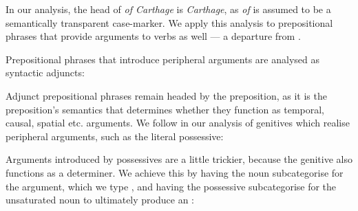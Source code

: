 \documentclass[11pt]{article}
\begin{document}
In our analysis, the head of \emph{of Carthage} is \emph{Carthage}, as \emph{of} is
assumed to be a semantically transparent case-marker. We apply this analysis
to prepositional phrases that provide arguments to verbs as well --- a
departure from \ccgbank.

Prepositional phrases that introduce peripheral arguments are analysed as
syntactic adjuncts:

\begin{center}
\end{center}


Adjunct prepositional phrases remain headed by the preposition, as it is the
preposition's semantics that determines whether they function as temporal,
causal, spatial etc. arguments. We follow \citet{hock:cl07} in our analysis
of genitives which  realise peripheral arguments, such as the literal possessive:

 \begin{center}
\end{center}

Arguments introduced by possessives are a little trickier, because the genitive
also functions as a determiner. We achieve this by having the noun subcategorise
for the argument, which we type , and having the possessive subcategorise
for the unsaturated noun to ultimately produce an :

\begin{center}
\end{center}
\end{document}
